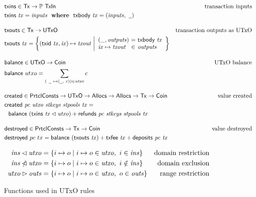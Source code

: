\documentclass[11pt,a4paper]{article}
\newcommand{\Tx}{\type{Tx}}
\newcommand{\UTxO}{\type{UTxO}}
\newcommand{\Coin}{\type{Coin}}
\newcommand{\PrtclConsts}{\type{PrtclConsts}}
\newcommand{\Allocs}{\type{Allocs}}
\newcommand{\TxIn}{\type{TxIn}}
\newcommand{\txins}[1]{\fun{txins}~ \var{#1}}
\newcommand{\txouts}[1]{\fun{txouts}~ \var{#1}}
\newcommand{\balance}[1]{\fun{balance}~ \var{#1}}
\newcommand{\deposits}[2]{\fun{deposits}~ \var{#1} ~ \var{#2}}
\newcommand{\refunds}[4]{\fun{refunds}~ \var{#1}~ \var{#2}~ \var{#3}~ \var{#4}}
\newcommand{\created}[5]{\fun{created}~ \var{#1}~ \var{#2}~ \var{#3}~ \var{#4}~ \var{#5}}
\newcommand{\txbody}[1]{\fun{txbody}~ \var{#1}}
\newcommand{\txfee}[1]{\fun{txfee}~ \var{#1}}
\newcommand{\wcard}[0]{\underline{\phantom{a}}}
\theoremstyle{definition}
\theoremstyle{definition}
\begin{document}
\begin{figure}
  \begin{align*}
    & \fun{txins} \in \Tx \to \powerset{\TxIn}
    & \text{transaction inputs} \\
    & \txins{tx} = \var{inputs} \where \txbody{tx} = (\var{inputs}, ~\wcard)
    \nextdef
    & \fun{txouts} \in \Tx \to \UTxO
    & \text{transaction outputs as UTxO} \\
    & \fun{txouts} ~ \var{tx} =
      \left\{ (\fun{txid} ~ \var{tx}, \var{ix}) \mapsto \var{txout} ~
      \middle| \begin{array}{l@{~}c@{~}l}
                 (\_, \var{outputs}) & = & \txbody{tx} \\
                 \var{ix} \mapsto \var{txout} & \in & \var{outputs}
               \end{array}
      \right\}
    \nextdef
    & \fun{balance} \in \UTxO \to \Coin
    & \text{UTxO balance} \\
    & \fun{balance} ~ utxo = \sum_{(~\wcard ~ \mapsto (\wcard, ~c)) \in \var{utxo}} c
    \nextdef
    & \fun{created} \in \PrtclConsts \to \UTxO \to \Allocs \to \Allocs \to \Tx \to \Coin
    & \text{value created} \\
    & \created{pc}{utxo}{stkeys}{stpools}{tx} = \\
    & ~~\balance{(\txins{tx} \restrictdom \var{utxo})} + \refunds{pc}{stkeys}{stpools}{tx}
    \nextdef
    & \fun{destroyed} \in \PrtclConsts \to \Tx \to \Coin
    & \text{value destroyed} \\
    & \fun{destroyed} ~ pc ~ tx =
      \balance{(\txouts{tx})}  + \txfee{tx} + \deposits{pc}{tx}\\
  \end{align*}

  \begin{align*}
    \mathit{ins} \lhd \mathit{utxo}
    & = \{ i \mapsto o \mid i \mapsto o \in \mathit{utxo}, ~ i \in \mathit{ins} \}
    & \text{domain restriction}
    \\
    \mathit{ins} \mathbin{\slashed{\lhd}} \mathit{utxo}
    & = \{ i \mapsto o \mid i \mapsto o \in \mathit{utxo}, ~ i \notin \mathit{ins} \}
    & \text{domain exclusion}
    \\
    \mathit{utxo} \rhd \mathit{outs}
    & = \{ i \mapsto o \mid i \mapsto o \in \mathit{utxo}, ~ o \in \mathit{outs} \}
    & \text{range restriction}
  \end{align*}
  \caption{Functions used in UTxO rules}
  \label{fig:derived-defs:utxo}
\end{figure}
\end{document}
